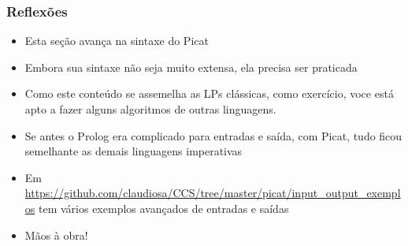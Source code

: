 
\begin{frame}[fragile]
\frametitle{Reflexões}

\begin{itemize}

  \item Esta seção avança na sintaxe do Picat 
  
  \pause
  \item Embora sua sintaxe não seja muito extensa, ela precisa 
  ser praticada
  
   \pause
  \item Como este conteúdo se assemelha as LPs clássicas, como exercício,
  voce está apto a fazer alguns algoritmos de outras linguagens.

  \pause
  \item Se antes o Prolog era complicado para entradas e saída, com Picat,
  tudo ficou semelhante as demais linguagens imperativas
  
  \pause
  \item Em \url{https://github.com/claudiosa/CCS/tree/master/picat/input_output_exemplos}
  tem vários exemplos avançados de entradas e saídas 
  
  \pause
  \item Mãos à obra!
 
\end{itemize}

\end{frame}
